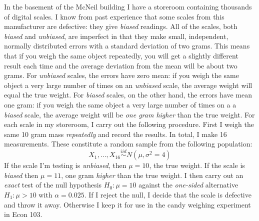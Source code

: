 \documentclass[addpoints,12pt]{exam}
\begin{document}
\begin{questions}
\question In the basement of the McNeil building I have a storeroom containing thousands of digital scales. I know from past experience that some scales from this manufacturer are defective: they give \emph{biased} readings. All of the scales, both \emph{biased} and \emph{unbiased}, are imperfect in that they make small, independent, normally distributed errors with a standard deviation of two grams. This means that if you weigh the same object repeatedly, you will get a slightly different result each time and the average deviation from the mean will be about two grams. For \emph{unbiased} scales, the errors have zero mean: if you weigh the same object a very large number of times on an \emph{unbiased} scale, the average weight will equal the true weight. For \emph{biased} scales, on the other hand, the errors have mean one gram: if you weigh the same object a very large number of times on a a \emph{biased} scale, the average weight will be \emph{one gram higher} than the true weight. For each scale in my storeroom, I carry out the following procedure. First I weigh the same 10 gram mass \emph{repeatedly} and record the results. In total, I make 16 measurements. These constitute a random sample from the following population:
 $$X_1, \hdots, X_{16} \overset{iid}{\sim} N( \mu, \sigma^2 = 4)$$ 
 If the scale I'm testing is \emph{unbiased}, then $\mu = 10$, the true weight. If the scale is \emph{biased} then $\mu =11$, one gram \emph{higher} than the true weight. I then carry out an \emph{exact} test of the null hypothesis $H_0 \colon \mu = 10$ against the \emph{one-sided} alternative $H_1\colon \mu > 10$ with $\alpha =0.025$. If I reject the null, I decide that the scale is defective and throw it away. Otherwise I keep it for use in the candy weighing experiment in Econ 103.
\end{questions}
\end{document}
